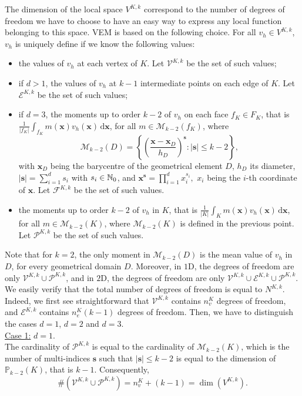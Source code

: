 The dimension of the local space $V^{K,k}$ correspond to the number of degrees of freedom we have to choose to have an easy way to express any local function belonging to this space. VEM is based on the following choice. For all $v_h\in V^{K,k}$, $v_h$ is uniquely define if we know the following values:
\begin{itemize}
\item the values of $v_h$ at each vertex of $K$. Let $\mathcal{V}^{K,k}$ be the set of such values;
\item if $d>1$, the values of $v_h$ at $k-1$ intermediate points on each edge of $K$. Let $\mathcal{E}^{K,k}$ be the set of such values;
\item if $d=3$, the moments up to order $k-2$ of $v_h$ on each face $f_K\in F_K$, that is $\frac{1}{|f_K|}\int_{f_K}m(\mathbf{x})v_h(\mathbf{x})\, \mathrm{d}\mathbf{x}$, for all $m\in \mathcal{M}_{k-2}(f_K)$, where $$\mathcal{M}_{k-2}(D) = \left\{\left(\frac{\mathbf{x}-\mathbf{x}_D}{h_D}\right)^\mathbf{s} : |\mathbf{s}|\leq k-2\right\},$$ with $\mathbf{x}_D$ being the barycentre of the geometrical element $D$, $h_D$ its diameter, $|\mathbf{s}| = \sum_{i=1}^d s_i$ with $s_i\in \mathbb{N}_0$, and $\mathbf{x}^\mathbf{s}=\prod_{i=1}^d x_i^{s_i},$ $x_i$ being the $i$-th coordinate of $\mathbf{x}$. Let $\mathcal{F}^{K,k}$ be the set of such values.
\item the moments up to order $k-2$ of $v_h$ in $K$, that is $\frac{1}{|K|}\int_Km(\mathbf{x})v_h(\mathbf{x})\, \mathrm{d}\mathbf{x}$, for all $m\in \mathcal{M}_{k-2}(K)$, where $\mathcal{M}_{k-2}(K)$ is defined in the previous point. Let $\mathcal{P}^{K,k}$ be the set of such values.
\end{itemize}

\noindent Note that for $k=2$, the only moment in $\mathcal{M}_{k-2}(D)$ is the mean value of $v_h$ in $D$, for every geometrical domain $D$.  Moreover, in $1$D, the degrees of freedom are only $\mathcal{V}^{K,k}\cup\mathcal{P}^{K,k}$, and in $2$D, the degrees of freedom are only $\mathcal{V}^{K,k}\cup\mathcal{E}^{K,k} \cup\mathcal{P}^{K,k}$.
We easily verify that the total number of degrees of freedom is equal to $N^{K,k}$. Indeed, we first see straightforward that $\mathcal{V}^{K,k}$ contains $n_v^K$ degrees of freedom, and $\mathcal{E}^{K,k}$ contains $n_e^K(k-1)$ degrees of freedom. Then, we have to distinguish the cases $d=1$, $d=2$ and $d=3$. \\

\noindent \underline{Case 1:} $d=1$. \\
\noindent The cardinality of $\mathcal{P}^{K,k}$ is equal to the cardinality of $\mathcal{M}_{k-2}(K)$, which is the number of multi-indices $\mathbf{s}$ such that $|\mathbf{s}|\leq k-2$ is equal to the dimension of $\mathbb{P}_{k-2}(K)$, that is $k-1$. Consequently, 
$$\#\left(\mathcal{V}^{K,k} \cup\mathcal{P}^{K,k}\right)=n_v^K
+(k-1)= \dim\left(V^{K,k}\right).
$$

